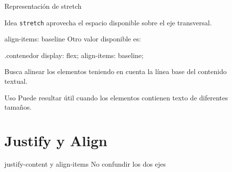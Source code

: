 \documentclass[aspectratio=169,11.5pt]{beamer}
\begin{document}
    \begin{frame}{Representación de stretch}
        \begin{center}
        \end{center}

        \begin{block}{Idea}
            \texttt{stretch} aprovecha el espacio
            disponible sobre el eje transversal.
        \end{block}
    \end{frame}

    \begin{frame}[fragile]{align-items: baseline}
        Otro valor disponible es:

        \begin{csscodedark}
            .contenedor {
                display: flex;
                align-items: baseline;
            }
        \end{csscodedark}

        Busca alinear los elementos teniendo en cuenta
        la línea base del contenido textual.

        \begin{block}{Uso}
            Puede resultar útil cuando los elementos
            contienen texto de diferentes tamaños.
        \end{block}
    \end{frame}



    \section{Justify y Align}

    \SectionSlide
    {justify-content y align-items}
    {No confundir los dos ejes}
\end{document}
